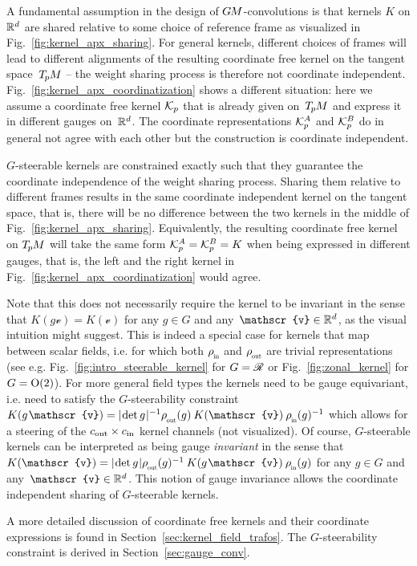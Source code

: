 A fundamental assumption in the design of $G\mkern-1.4muM$-convolutions is that kernels $K$ on $\mathbb{R}^d$ are shared relative to some choice of reference frame as visualized in Fig.~\ref{fig:kernel_apx_sharing}.
For general kernels, different choices of frames will lead to different alignments of the resulting coordinate free kernel on the tangent space~$T_{\mkern-1.5mu p}\mkern-.5muM$
-- the weight sharing process is therefore not coordinate independent.
Fig.~\ref{fig:kernel_apx_coordinatization} shows a different situation:
here we assume a coordinate free kernel $\mathcal{K}_p$ that is already given on~$T_{\mkern-1.5mu p}\mkern-.5muM$ and express it in different gauges on~$\mathbb{R}^d$.
The coordinate representations $\mathcal{K}_p^A$ and $\mathcal{K}_p^B$ do in general not agree with each other but the construction is coordinate independent.


$G$-steerable kernels are constrained exactly such that they guarantee the coordinate independence of the weight sharing process.
Sharing them relative to different frames results in the same coordinate independent kernel on the tangent space,
that is, there will be no difference between the two kernels in the middle of Fig.~\ref{fig:kernel_apx_sharing}.
Equivalently, the resulting coordinate free kernel on $T_{\mkern-1.5mu p}\mkern-.5muM$ will take the same form $\mathcal{K}_p^A = \mathcal{K}_p^B = K$ when being expressed in different gauges,
that is, the left and the right kernel in Fig.~\ref{fig:kernel_apx_coordinatization} would agree.


Note that this does not necessarily require the kernel to be invariant in the sense that $K(g\mathscr{v}) = K(\mathscr{v})$ for any $g\in G$ and any~$\mathscr{v}\in\R^d$, as the visual intuition might suggest.
This is indeed a special case for kernels that map between scalar fields, i.e. for which both $\rhoin$ and $\rhoout$ are trivial representations (see e.g. Fig.~\ref{fig:intro_steerable_kernel} for $G=\mathscr{R}$ or Fig.~\ref{fig:zonal_kernel} for $G=\operatorname{O}(2)$).
For more general field types the kernels need to be gauge equivariant, i.e. need to satisfy the $G$-steerability constraint
$K(g\mkern1.5mu \mathscr{v}) = \detg^{-1} \rhoout(g)\: K(\mathscr{v})\: \rhoin(g)^{-1}$
which allows for a steering of the ${{c_\textup{out}}\times{c_\textup{in}}}$ kernel channels (not visualized).
Of course, $G$-steerable kernels can be interpreted as being gauge \emph{invariant} in the sense that
$K(\mathscr{v}) = \detg \rhoout(g)^{-1}\: K(g\mkern1.5mu \mathscr{v})\: \rhoin(g)$
for any $g\in G$ and any~$\mathscr{v}\in\R^d$.
This notion of gauge invariance allows the coordinate independent sharing of $G$-steerable kernels.


A more detailed discussion of coordinate free kernels and their coordinate expressions is found in Section~\ref{sec:kernel_field_trafos}.
The $G$-steerability constraint is derived in Section~\ref{sec:gauge_conv}.
